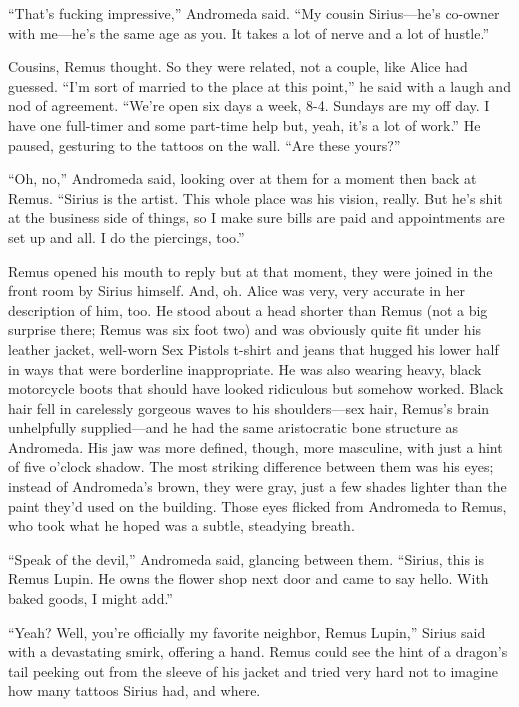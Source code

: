 “That’s fucking impressive,” Andromeda said. “My cousin Sirius—he’s co-owner with me—he’s the same age as you. It takes a lot of nerve and a lot of hustle.”

Cousins, Remus thought. So they were related, not a couple, like Alice had guessed. “I’m sort of married to the place at this point,” he said with a laugh and nod of agreement. “We’re open six days a week, 8-4. Sundays are my off day. I have one full-timer and some part-time help but, yeah, it’s a lot of work.” He paused, gesturing to the tattoos on the wall. “Are these yours?”

“Oh, no,” Andromeda said, looking over at them for a moment then back at Remus. “Sirius is the artist. This whole place was his vision, really. But he’s shit at the business side of things, so I make sure bills are paid and appointments are set up and all. I do the piercings, too.”

Remus opened his mouth to reply but at that moment, they were joined in the front room by Sirius himself. And, oh. Alice was very, very accurate in her description of him, too. He stood about a head shorter than Remus (not a big surprise there; Remus was six foot two) and was obviously quite fit under his leather jacket, well-worn Sex Pistols t-shirt and jeans that hugged his lower half in ways that were borderline inappropriate. He was also wearing heavy, black motorcycle boots that should have looked ridiculous but somehow worked. Black hair fell in carelessly gorgeous waves to his shoulders—sex hair, Remus’s brain unhelpfully supplied—and he had the same aristocratic bone structure as Andromeda. His jaw was more defined, though, more masculine, with just a hint of five o’clock shadow. The most striking difference between them was his eyes; instead of Andromeda’s brown, they were gray, just a few shades lighter than the paint they’d used on the building. Those eyes flicked from Andromeda to Remus, who took what he hoped was a subtle, steadying breath.

“Speak of the devil,” Andromeda said, glancing between them. “Sirius, this is Remus Lupin. He owns the flower shop next door and came to say hello. With baked goods, I might add.”

“Yeah? Well, you’re officially my favorite neighbor, Remus Lupin,” Sirius said with a devastating smirk, offering a hand. Remus could see the hint of a dragon’s tail peeking out from the sleeve of his jacket and tried very hard not to imagine how many tattoos Sirius had, and where.


